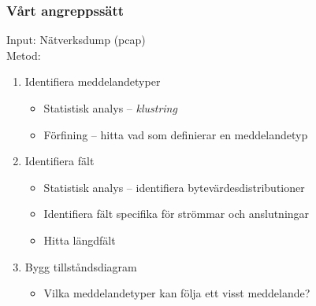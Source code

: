 \documentclass[xetex]{beamer}
\begin{document}
    \begin{frame}
        \frametitle{Vårt angreppssätt}
        Input: Nätverksdump (pcap)\\
        Metod:
        \begin{enumerate}
            \item Identifiera meddelandetyper
                \begin{itemize}
                    \item Statistisk analys -- \emph{klustring}
                    \item Förfining -- hitta vad som definierar en meddelandetyp
                \end{itemize}
            \item Identifiera fält
                \begin{itemize}
                    \item Statistisk analys -- identifiera bytevärdesdistributioner
                    \item Identifiera fält specifika för strömmar och anslutningar
                    \item Hitta längdfält
                \end{itemize}
            \item Bygg tillståndsdiagram
                \begin{itemize}
                    \item Vilka meddelandetyper kan följa ett visst meddelande?
                \end{itemize}
        \end{enumerate}
    \end{frame}
    
\end{document}
